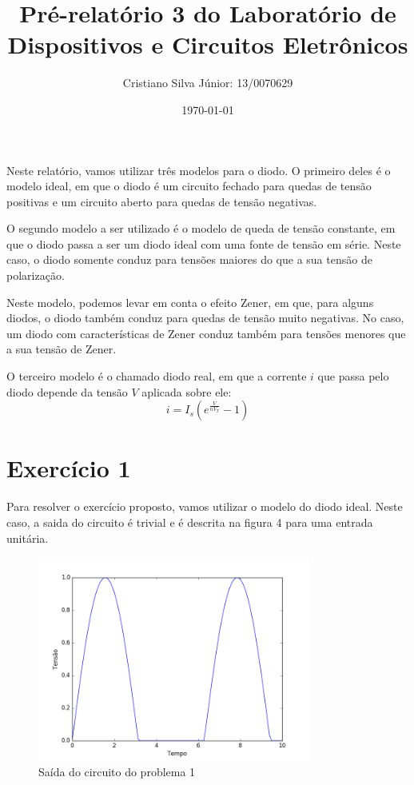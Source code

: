 \documentclass[12pt, a4paper, twoside]{article}
\begin{document}
\title{Pré-relatório 3 do Laboratório de Dispositivos e Circuitos Eletrônicos}
\author{Cristiano Silva Júnior: 13/0070629}
\date{\today}
\maketitle

Neste relatório, vamos utilizar três modelos para o diodo. O primeiro deles é o modelo
ideal, em que o diodo é um circuito fechado para quedas de tensão positivas e um
circuito aberto para quedas de tensão negativas.


O segundo modelo a ser utilizado é o modelo de queda de tensão constante, em que o
diodo passa a ser um diodo ideal com uma fonte de tensão em série. Neste caso, o diodo
somente conduz para tensões maiores do que a sua tensão de polarização.


Neste modelo, podemos levar em conta o efeito Zener, em que, para alguns diodos, o diodo
também conduz para quedas de tensão muito negativas. No caso, um diodo com
características de Zener conduz também para tensões menores que a sua tensão de Zener.

O terceiro modelo é o chamado diodo real, em que a corrente $i$ que passa pelo diodo
depende da tensão $V$ aplicada sobre ele:
$$i = I_s\left( e^{\frac{V}{nV_T}} - 1 \right)$$

\section{Exercício 1}


Para resolver o exercício proposto, vamos utilizar o modelo do diodo ideal. Neste caso,
a saida do circuito é trivial e é descrita na figura 4 para uma entrada unitária.

\begin{figure}
    \centering
    \includegraphics[width=0.8\textwidth]{figs/rel3/ex1.png}
    \caption{Saída do circuito do problema 1}
\end{figure}
\end{document}
